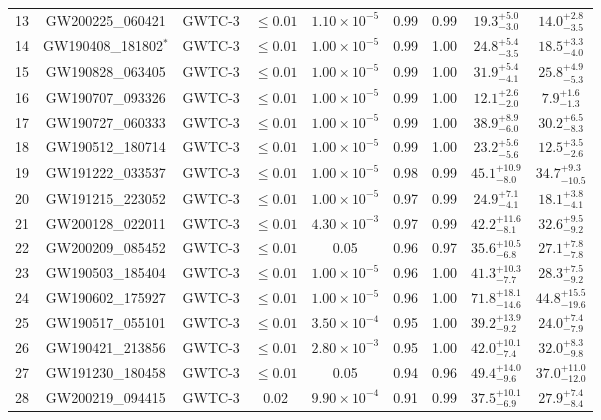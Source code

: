 \begin{table*}[ht]
\begin{tabular}{!{\vrule width 1pt}lcccccccc!{\vrule width 1pt}}
13 & GW200225\_060421 & GWTC-3 & $\leq 0.01$ & $1.10 \times 10^{-5}$ & 0.99 & 0.99 & $19.3^{+5.0}_{-3.0}$ & $14.0^{+2.8}_{-3.5}$ \\
14 & GW190408\_181802$^{*}$ & GWTC-3 & $\leq 0.01$ & $1.00 \times 10^{-5}$ & 0.99 & 1.00 & $24.8^{+5.4}_{-3.5}$ & $18.5^{+3.3}_{-4.0}$ \\
15 & GW190828\_063405 & GWTC-3 & $\leq 0.01$ & $1.00 \times 10^{-5}$ & 0.99 & 1.00 & $31.9^{+5.4}_{-4.1}$ & $25.8^{+4.9}_{-5.3}$ \\
16 & GW190707\_093326 & GWTC-3 & $\leq 0.01$ & $1.00 \times 10^{-5}$ & 0.99 & 1.00 & $12.1^{+2.6}_{-2.0}$ & $7.9^{+1.6}_{-1.3}$ \\
17 & GW190727\_060333 & GWTC-3 & $\leq 0.01$ & $1.00 \times 10^{-5}$ & 0.99 & 1.00 & $38.9^{+8.9}_{-6.0}$ & $30.2^{+6.5}_{-8.3}$ \\
18 & GW190512\_180714 & GWTC-3 & $\leq 0.01$ & $1.00 \times 10^{-5}$ & 0.99 & 1.00 & $23.2^{+5.6}_{-5.6}$ & $12.5^{+3.5}_{-2.6}$ \\
19 & GW191222\_033537 & GWTC-3 & $\leq 0.01$ & $1.00 \times 10^{-5}$ & 0.98 & 0.99 & $45.1^{+10.9}_{-8.0}$ & $34.7^{+9.3}_{-10.5}$ \\
20 & GW191215\_223052 & GWTC-3 & $\leq 0.01$ & $1.00 \times 10^{-5}$ & 0.97 & 0.99 & $24.9^{+7.1}_{-4.1}$ & $18.1^{+3.8}_{-4.1}$ \\
21 & GW200128\_022011 & GWTC-3 & $\leq 0.01$ & $4.30 \times 10^{-3}$ & 0.97 & 0.99 & $42.2^{+11.6}_{-8.1}$ & $32.6^{+9.5}_{-9.2}$ \\
22 & GW200209\_085452 & GWTC-3 & $\leq 0.01$ & 0.05 & 0.96 & 0.97 & $35.6^{+10.5}_{-6.8}$ & $27.1^{+7.8}_{-7.8}$ \\
23 & GW190503\_185404 & GWTC-3 & $\leq 0.01$ & $1.00 \times 10^{-5}$ & 0.96 & 1.00 & $41.3^{+10.3}_{-7.7}$ & $28.3^{+7.5}_{-9.2}$ \\
24 & GW190602\_175927 & GWTC-3 & $\leq 0.01$ & $1.00 \times 10^{-5}$ & 0.96 & 1.00 & $71.8^{+18.1}_{-14.6}$ & $44.8^{+15.5}_{-19.6}$ \\
25 & GW190517\_055101 & GWTC-3 & $\leq 0.01$ & $3.50 \times 10^{-4}$ & 0.95 & 1.00 & $39.2^{+13.9}_{-9.2}$ & $24.0^{+7.4}_{-7.9}$ \\
26 & GW190421\_213856 & GWTC-3 & $\leq 0.01$ & $2.80 \times 10^{-3}$ & 0.95 & 1.00 & $42.0^{+10.1}_{-7.4}$ & $32.0^{+8.3}_{-9.8}$ \\
27 & GW191230\_180458 & GWTC-3 & $\leq 0.01$ & 0.05 & 0.94 & 0.96 & $49.4^{+14.0}_{-9.6}$ & $37.0^{+11.0}_{-12.0}$ \\
28 & GW200219\_094415 & GWTC-3 & 0.02 & $9.90 \times 10^{-4}$ & 0.91 & 0.99 & $37.5^{+10.1}_{-6.9}$ & $27.9^{+7.4}_{-8.4}$ \\

\end{tabular}
\end{table*}
